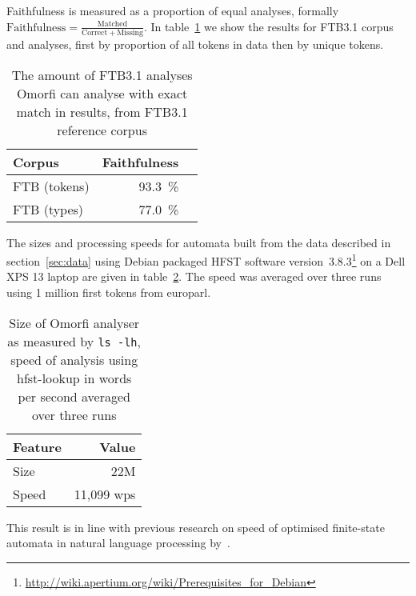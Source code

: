 \documentclass[preprint]{flammie}
\begin{document}
Faithfulness is measured as a proportion of equal analyses, formally $\mathrm{Faithfulness} =
\frac{\mathrm{Matched}}{\mathrm{Correct} + \mathrm{Missing}}$. In
table~\ref{table:quality} we show the results for FTB3.1 corpus and
analyses, first by proportion of all tokens in data then by unique tokens.

\begin{table}
    \begin{scriptsize}
    \centering
    \begin{tabular}{|l|r|r|}
        \hline
        \bf Corpus & \bf Faithfulness \\
        \hline
        FTB (tokens) & 93.3~\% \\
        FTB (types)  & 77.0~\% \\
        \hline
    \end{tabular}
    \caption{The amount of FTB3.1 analyses Omorfi can analyse with exact
    match in results, from FTB3.1 reference corpus\label{table:quality}}
  \end{scriptsize}
\end{table}

The sizes and processing speeds for automata built from the data described in
section~\ref{sec:data} using Debian packaged HFST software
version~3.8.3\footnote{\url{http://wiki.apertium.org/wiki/Prerequisites_for_Debian}}
on a Dell XPS 13 laptop are given in table~\ref{table:size-speed}. The speed
was averaged over three runs using 1 million first tokens from europarl.

\begin{table}
    \begin{scriptsize}
        \centering
        \begin{tabular}{|l|r|}
            \hline
            \bf Feature & \bf Value \\
            \hline
            Size & 22M \\
            Speed & 11,099 wps\\
            \hline
        \end{tabular}
        \caption{Size of Omorfi analyser as measured by \texttt{ls -lh}, speed
        of analysis using hfst-lookup in words per second averaged over three runs
    \label{table:size-speed}}
    \end{scriptsize}
\end{table}

This result is in line with previous research on speed of optimised finite-state
automata in natural language processing by~\citet{silfverberg2009hfst}.
\end{document}
